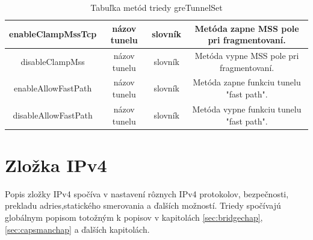 \begin{table}[H]
{\begin{tabular}{|c|c|c|c|}
enableClampMssTcp & názov tunelu & slovník & Metóda zapne MSS pole pri fragmentovaní. \\ \hline
disableClampMss & názov tunelu & slovník & Metóda vypne MSS pole pri fragmentovaní. \\ \hline
enableAllowFastPath & názov tunelu & slovník & Metóda zapne funkciu tunelu "fast path". \\ \hline
disableAllowFastPath & názov tunelu & slovník & Metóda vypne funkciu tunelu "fast path". \\ \hline
\end{tabular}%
}
\caption{Tabuľka metód triedy greTunnelSet}
\label{tab:greTunel}
\end{table}
\section{Zložka IPv4}
Popis  zložky IPv4 spočíva v nastavení rôznych IPv4 protokolov, bezpečnosti, prekladu adries,statického smerovania a ďalších možností. Triedy spočívajú globálnym popisom totožným k popisov v kapitolách \ref{sec:bridgechap}, \ref{sec:capsmanchap} a ďalších kapitolách.  
